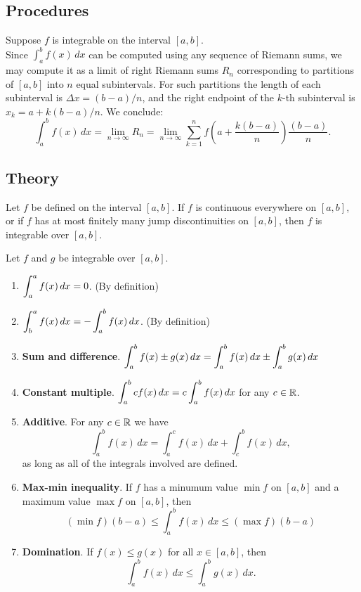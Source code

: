 
\subsection*{Procedures}
\begin{namedtheorem} Suppose $f$ is integrable on the interval $[a,b]$. \\
  Since $\displaystyle\int_a^bf(x)\, dx$ can be computed using any sequence of Riemann sums, we may compute it as a limit of right Riemann sums $R_n$ corresponding to partitions of $[a,b]$ into $n$ equal subintervals. For such partitions the length of each subinterval is $\Delta x=(b-a)/n$, and the right endpoint of the $k$-th subinterval is $x_k=a+k(b-a)/n$. We conclude:
  \[
  \int_a^b f(x)\, dx=\lim_{n\to\infty} R_n=\lim_{n\to\infty}\sum_{k=1}^n f\left(a+\frac{k(b-a)}{n}\right)\frac{(b-a)}{n}.
  \]

\end{namedtheorem}

 \subsection*{Theory}
\begin{namedtheorem} Let $f$ be defined on the interval $[a,b]$.
If $f$ is continuous everywhere on $[a,b]$, or if $f$ has at most finitely many jump discontinuities on $[a,b]$, then $f$ is integrable over $[a,b]$.
\end{namedtheorem}

\begin{namedtheorem}
  Let $f$ and $g$ be integrable over $[a,b]$.
  \begin{enumerate}
    \item $\displaystyle\int_a^a f(x)\, dx=0$. (By definition)
    \item $\displaystyle\int_b^af(x)\, dx=-\int_a^b f(x)\, dx$. (By definition)
    \item {\bf Sum and difference}. $\displaystyle\int_a^b f(x)\pm g(x)\, dx=\int_a^bf(x)\, dx\pm \int_a^bg(x)\, dx$
    \item {\bf Constant multiple}. $\displaystyle\int_a^bcf(x)\, dx=c\int_a^bf(x)\, dx$ for any $c\in {\mathbb R}$.
    \item {\bf Additive}. For any $c\in {\mathbb R}$ we have
    \[
    \int_a^bf(x)\, dx=\int_a^cf(x)\, dx+\int_c^b f(x)\, dx,
    \]
    as long as all of the integrals involved are defined.
    \item {\bf Max-min inequality}. If $f$ has a minumum value $\min f$ on $[a,b]$ and a maximum value $\max f$ on $[a,b]$, then
    \[
    (\min f)(b-a)\leq \int_a^b f(x)\, dx\leq (\max f)(b-a)
    \]
    \item {\bf Domination}. If $f(x)\leq g(x)$ for all $x\in [a,b]$, then
    \[
    \int_a^bf(x)\, dx\leq \int_a^bg(x)\, dx.
    \]

  \end{enumerate}

\end{namedtheorem}

